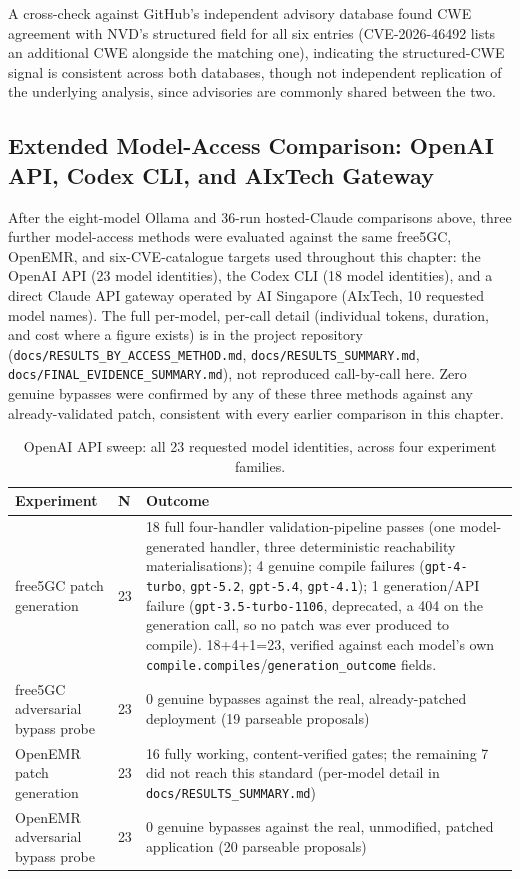 \documentclass[12pt,a4paper]{report}
\begin{document}
A cross-check against GitHub's independent advisory database found CWE agreement with NVD's structured field for all six entries (CVE-2026-46492 lists an additional CWE alongside the matching one), indicating the structured-CWE signal is consistent across both databases, though not independent replication of the underlying analysis, since advisories are commonly shared between the two.

\subsection{Extended Model-Access Comparison: OpenAI API, Codex CLI, and AIxTech Gateway}
\label{sec:extended-access-comparison}

After the eight-model Ollama and 36-run hosted-Claude comparisons above, three further model-access methods were evaluated against the same free5GC, OpenEMR, and six-CVE-catalogue targets used throughout this chapter: the OpenAI API (23 model identities), the Codex CLI (18 model identities), and a direct Claude API gateway operated by AI Singapore (AIxTech, 10 requested model names). The full per-model, per-call detail (individual tokens, duration, and cost where a figure exists) is in the project repository (\texttt{docs/RESULTS\_BY\_ACCESS\_METHOD.md}, \texttt{docs/RESULTS\_SUMMARY.md}, \texttt{docs/FINAL\_EVIDENCE\_SUMMARY.md}), not reproduced call-by-call here. Zero genuine bypasses were confirmed by any of these three methods against any already-validated patch, consistent with every earlier comparison in this chapter.

\begin{table}[H]
\centering
\caption{OpenAI API sweep: all 23 requested model identities, across four experiment families.}
\label{tab:openai-sweep}
\begin{tabular}{@{}p{4cm}p{1cm}p{9cm}@{}}
\toprule
\textbf{Experiment} & \textbf{N} & \textbf{Outcome} \\
\midrule
free5GC patch generation & 23 & 18 full four-handler validation-pipeline passes (one model-generated handler, three deterministic reachability materialisations); 4 genuine compile failures (\texttt{gpt-4-turbo}, \texttt{gpt-5.2}, \texttt{gpt-5.4}, \texttt{gpt-4.1}); 1 generation/API failure (\texttt{gpt-3.5-turbo-1106}, deprecated, a 404 on the generation call, so no patch was ever produced to compile). 18+4+1=23, verified against each model's own \texttt{compile.compiles}/\texttt{generation\_outcome} fields. \\
free5GC adversarial bypass probe & 23 & 0 genuine bypasses against the real, already-patched deployment (19 parseable proposals) \\
OpenEMR patch generation & 23 & 16 fully working, content-verified gates; the remaining 7 did not reach this standard (per-model detail in \texttt{docs/RESULTS\_SUMMARY.md}) \\
OpenEMR adversarial bypass probe & 23 & 0 genuine bypasses against the real, unmodified, patched application (20 parseable proposals) \\
\bottomrule
\end{tabular}
\end{table}
\end{document}
